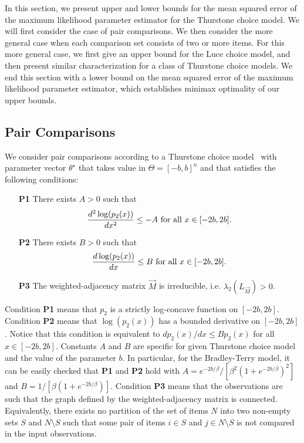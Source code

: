 In this section, we present upper and lower bounds for the mean squared error of the maximum likelihood parameter estimator for the Thurstone choice model. We will first consider the case of pair comparisons. We then consider the more general case when each comparison set consists of two or more items. For this more general case, we first give an upper bound for the Luce choice model, and then present similar characterization for a class of Thurstone choice models. We end this section with a lower bound on the mean squared error of the maximum likelihood parameter estimator, which establishes minimax optimality of our upper bounds.   

\subsection{Pair Comparisons}
\label{sec:pairs}

We consider pair comparisons according to a Thurstone choice model \GT\ with parameter vector $\theta^\star$ that takes value in $\Theta = [-b,b]^n$ and that satisfies the following conditions:
\begin{itemize}
\item[\bf P1] There exists $A > 0$ such that
\begin{equation}
\frac{d^2 \log(p_2(x))}{dx^2} \leq -A \hbox{ for all } x\in [-2b,2b].
\label{equ:Bcond}
\end{equation} 
\item[\bf P2] There exists $B > 0$ such that
\begin{equation}
\frac{d \log(p_2(x))}{dx} \leq B \hbox{ for all } x \in [-2b,2b].
\label{equ:Acond}
\end{equation}
\item [\bf P3] The weighted-adjacency matrix $\vec{M}$ is irreducible, i.e. $\lambda_2(L_{\vec{M}}) > 0$.
\end{itemize}

Condition {\bf P1} means that $p_2$ is a strictly log-concave function on $[-2b,2b]$. Condition {\bf P2} means that $\log(p_2(x))$ has a bounded derivative on $[-2b,2b]$. Notice that this condition is equivalent to $dp_2(x)/dx \leq B p_2(x)$ for all $x\in [-2b,2b]$. Constants $A$ and $B$ are specific for given Thurstone choice model and the value of the parameter $b$. In particular, for the Bradley-Terry model, it can be easily checked that  {\bf P1} and {\bf P2} hold with $A = e^{-2b/\beta}/[\beta^2(1+e^{-2b/\beta})^2]$ and $B = 1/[\beta(1+e^{-2b/\beta})]$. Condition {\bf P3} means that the observations are such that the graph defined by the weighted-adjacency matrix is connected. Equivalently, there exists no partition of the set of items $N$ into two non-empty sets $S$ and $N\setminus S$ such that some pair of items $i\in S$ and $j\in N\setminus S$ is not compared in the input observations.

